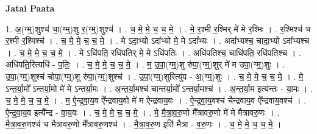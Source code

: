 \documentclass[17pt]{extarticle}
\begin{document}
\textbf{Jatai Paata} \newline

1. अ॒(ग्म्॒)शुश्च॑ चा॒(ग्म्॒)शु र॒(ग्म्॒)शुश्च॑ । . च॒ मे॒ मे॒ च॒ च॒ मे॒ । . मे॒ र॒श्मी र॒श्मिर् मे॑ मे र॒श्मिः । . र॒श्मिश्च॑ च र॒श्मी र॒श्मिश्च॑ । . च॒ मे॒ मे॒ च॒ च॒ मे॒ । . मे ऽदा॒भ्यो ऽदा᳚भ्यो मे॒ मे ऽदा᳚भ्यः । . अदा᳚भ्यश्च॒ चादा॒भ्यो ऽदा᳚भ्यश्च । . च॒ मे॒ मे॒ च॒ च॒ मे॒ । . मे ऽधि॑पति॒ रधि॑पतिर् मे॒ मे ऽधि॑पतिः । . अधि॑पतिश्च॒ चाधि॑पति॒ रधि॑पतिश्च । . अधि॑पति॒रित्यधि॑ - प॒तिः॒ । . च॒ मे॒ मे॒ च॒ च॒ मे॒ । . म॒ उ॒पा॒(ग्म्॒)शु रु॑पा॒(ग्म्॒)शुर् मे॑ म उपा॒(ग्म्॒)शुः । . उ॒पा॒(ग्म्॒)शुश्च॑ चोपा॒(ग्म्॒)शु रु॑पा॒(ग्म्॒)शुश्च॑ । . उ॒पा॒(ग्म्॒)शुरित्यु॑प - अ॒(ग्म्॒)शुः । . च॒ मे॒ मे॒ च॒ च॒ मे॒ । . मे॒ ऽन्त॒र्या॒मो᳚ ऽन्तर्या॒मो मे॑ मे ऽन्तर्या॒मः । . अ॒न्त॒र्या॒मश्च॑ चान्तर्या॒मो᳚ ऽन्तर्या॒मश्च॑ । . अ॒न्त॒र्या॒म इत्य॑न्तः - या॒मः । . च॒ मे॒ मे॒ च॒ च॒ मे॒ । . म॒ ऐ॒न्द्र॒वा॒य॒व ऐ᳚न्द्रवाय॒वो मे॑ म ऐन्द्रवाय॒वः । . ऐ॒न्द्र॒वा॒य॒वश्च॑ चैन्द्रवाय॒व ऐ᳚न्द्रवाय॒वश्च॑ । . ऐ॒न्द्र॒वा॒य॒व इत्यै᳚न्द्र - वा॒य॒वः । . च॒ मे॒ मे॒ च॒ च॒ मे॒ । . मे॒ मै॒त्रा॒व॒रु॒णो मै᳚त्रावरु॒णो मे॑ मे मैत्रावरु॒णः । . मै॒त्रा॒व॒रु॒णश्च॑ च मैत्रावरु॒णो मै᳚त्रावरु॒णश्च॑ । . मै॒त्रा॒व॒रु॒ण इति॑ मैत्रा - व॒रु॒णः । . च॒ मे॒ मे॒ च॒ च॒ मे॒ । \newline
\end{document}
